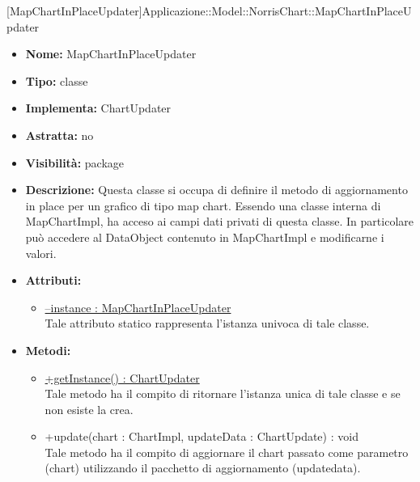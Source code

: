 			
			[MapChartInPlaceUpdater]{Applicazione::Model::NorrisChart::MapChartInPlaceUpdater}
			

	
			
			\begin{itemize}
			\item \textbf{Nome:} MapChartInPlaceUpdater
			\item \textbf{Tipo:} classe
			
		\item \textbf{Implementa:}
		ChartUpdater
		\item \textbf{Astratta:}
		no
			\item \textbf{Visibilità:} package
			\item \textbf{Descrizione:} Questa classe si occupa di definire il metodo di aggiornamento in place per un grafico di tipo map chart. Essendo una classe interna di MapChartImpl, ha acceso ai campi dati privati di questa classe. In particolare può accedere al DataObject contenuto in MapChartImpl e modificarne i valori.
			\item \textbf{Attributi:}
				\begin{itemize}
				\setlength{\itemsep}{5pt}
				
					\item[\ding{111}] \underline{--instance : MapChartInPlaceUpdater} \\ [1mm] Tale attributo statico rappresenta l'istanza univoca di tale classe.
				\end{itemize}
		
			\item \textbf{Metodi:}
				\begin{itemize}
				\setlength{\itemsep}{5pt}
				
					\item[\ding{111}] {\underline{+getInstance() : ChartUpdater}} \\ [1mm] Tale metodo ha il compito di ritornare l'istanza unica di tale classe e se non esiste la crea.
					\item[\ding{111}] {{+update(chart : ChartImpl, updateData : ChartUpdate) : void}} \\ [1mm] Tale metodo ha il compito di aggiornare il chart passato come parametro (chart) utilizzando il pacchetto di aggiornamento (updatedata).
				\end{itemize}
		
			\end{itemize}

